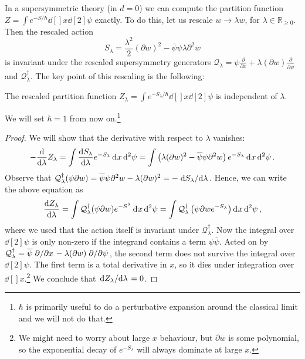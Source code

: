 In a supersymmetric theory (in $d = 0$) we can compute the partition function $Z = \int e^{-S / \hbar} \dd[]{x} \dd[2]{\psi}$ exactly.
To do this, let us rescale $w \to \lambda w$, for $\lambda \in \mathbb{R}_{\geq 0}$.
Then the rescaled action 
\begin{equation}
  S_{\lambda} = \frac{\lambda^2}{2} (\partial w)^2 - \overline{\psi} \psi \lambda \partial^2 w
\end{equation}
is invariant under the rescaled supersymmetry generators $\mathcal{Q}_{\lambda} = \psi \frac{\partial }{\partial x} + \lambda ( \partial w) \frac{\partial }{\partial \overline{\psi}}$  and $\mathcal{Q}^{\dagger}_{\lambda}$. The key point of this rescaling is the following:
\begin{claim}
  The rescaled partition function $Z_{\lambda} = \int e^{-S_{\lambda} / \hbar} \dd[]{x} \dd[2]{\psi}$ is independent of $\lambda$.
\end{claim}
\begin{leftbar}
  We will set $\hbar = 1$ from now on.\footnote{$\hbar$ is primarily useful to do a perturbative expansion around the classical limit and we will not do that.}
\end{leftbar}
\begin{proof}
  We will show that the derivative with respect to $\lambda$ vanishes:
  \begin{equation}
    -\dv{}{\lambda} Z_{\lambda} = \int \dv{S_{\lambda}}{\lambda} e^{-S_{\lambda}} \dd[]{x} \dd[2]{\psi} = \int \left( \lambda (\partial w)^2 - \overline{\psi} \psi \partial^2 w \right) e^{-S_\lambda} \dd[]{x} \dd[2]{\psi}.
  \end{equation}
  Observe that $\mathcal{Q}^{\dagger}_{\lambda}(\psi \partial w)= \overline{\psi} \psi \partial^2 w - \lambda(\partial w)^2 = - \dv*{S_{\lambda}}{\lambda}$.
  Hence, we can write the above equation as
  \begin{equation}
    \dv{Z_{\lambda}}{\lambda} = \int \mathcal{Q}^{\dagger}_{\lambda} (\psi \partial w) e^{-S^{\lambda}} \dd[]{x} \dd[2]{\psi} = \int \mathcal{Q}^{\dagger}_{\lambda} \left( \psi \partial w e^{-S_\lambda} \right) \dd[]{x} \dd[2]{\psi},
  \end{equation}
  where we used that the action itself is invariant under $\mathcal{Q}_{\lambda}^{\dagger}$.
  Now the integral over $\dd[2]{\psi}$ is only non-zero if the integrand contains a term $\psi \overline{\psi}{}$. Acted on by $\mathcal{Q}^{\dagger}_{\lambda} = \overline{\psi} \flatfrac{\partial }{\partial x} - \lambda (\partial w) \flatfrac{\partial }{\partial \psi}$, the second term does not survive the integral over $\dd[2]{\psi}$.
  The first term is a total derivative in $x$, so it dies under integration over $\dd[]{x}$.\footnote{We might need to worry about large $x$ behaviour, but $\partial w$ is some polynomial, so the exponential decay of $e^{-S_{\lambda}}$ will always dominate at large $x$.}
  We conclude that $\dv*{Z_{\lambda}}{\lambda} = 0$.
\end{proof}
